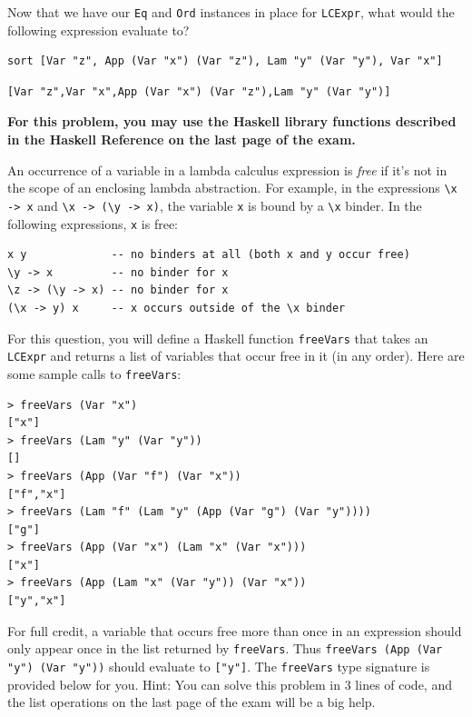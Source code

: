 \documentclass[addpoints]{exam}
\begin{document}
\begin{questions}
\begin{parts}
Now that we have our \texttt{Eq} and \texttt{Ord} instances in place for \texttt{LCExpr}, what would the following expression evaluate to?

\begin{verbatim}
sort [Var "z", App (Var "x") (Var "z"), Lam "y" (Var "y"), Var "x"]
\end{verbatim}

\begin{solutionorbox}[1.5in]
\begin{verbatim}
[Var "z",Var "x",App (Var "x") (Var "z"),Lam "y" (Var "y")]
\end{verbatim}
\end{solutionorbox}

\end{parts}

\newpage

\question[15] \textbf{For this problem, you may use the Haskell library functions described in the Haskell Reference on the last page of the exam.}

An occurrence of a variable in a lambda calculus expression is \emph{free} if it’s not in the scope of an enclosing lambda abstraction.  For example, in the expressions \verb|\x -> x| and \verb|\x -> (\y -> x)|,  the variable \texttt{x} is bound by a \verb|\x| binder.  In the following expressions, \texttt{x} is free:
\begin{verbatim}
x y             -- no binders at all (both x and y occur free)
\y -> x         -- no binder for x
\z -> (\y -> x) -- no binder for x
(\x -> y) x     -- x occurs outside of the \x binder
\end{verbatim}

For this question, you will define a Haskell function \texttt{freeVars} that takes an \texttt{LCExpr} and returns a list of variables that occur free in it (in any order).  Here are some sample calls to \texttt{freeVars}:

\begin{verbatim}
> freeVars (Var "x")
["x"]
> freeVars (Lam "y" (Var "y"))
[]
> freeVars (App (Var "f") (Var "x"))
["f","x"]
> freeVars (Lam "f" (Lam "y" (App (Var "g") (Var "y"))))
["g"]
> freeVars (App (Var "x") (Lam "x" (Var "x")))
["x"]
> freeVars (App (Lam "x" (Var "y")) (Var "x"))
["y","x"]
\end{verbatim}

For full credit, a variable that occurs free more than once in an expression should only appear once in the list returned by \texttt{freeVars}.  Thus \texttt{freeVars (App (Var "y") (Var "y"))} should evaluate to \texttt{["y"]}.  The \texttt{freeVars} type signature is provided below for you.  Hint: You can solve this problem in 3 lines of code, and the list operations on the last page of the exam will be a big help.


\end{questions}
\end{document}
